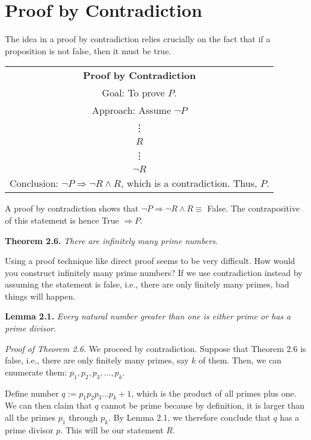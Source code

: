 \documentclass[12pt,a4paper]{article}
\begin{document}
\section*{Proof by Contradiction}
The idea in a proof by contradiction relies crucially on the fact that if a proposition is not false, then it must be true.

\begin{center}
\begin{tabular}{|c|}
\hline 
\textbf{Proof by Contradiction} \\ 
Goal: To prove $P$. \\ 
Approach: Assume $\neg P$ \\ 
\vdots \\ 
$R$ \\ 
\vdots \\ 
$\neg R$ \\ 
Conclusion: $\neg P\Rightarrow\neg R\wedge R$, which is a contradiction. Thus, $P$. \\ 
\hline 
\end{tabular} 
\end{center}

A proof by contradiction shows that $\neg P\Rightarrow\neg R\wedge R\equiv$ False. The contrapositive of this statement is hence True $\Rightarrow P$.

\newpage

\textbf{Theorem 2.6.} \textit{There are infinitely many prime numbers}.

\bigbreak

Using a proof technique like direct proof seems to be very difficult. How would you construct infinitely many prime numbers? If we use contradiction instead by assuming the statement is false, i.e., there are only finitely many primes, bad things will happen.

\bigbreak

\textbf{Lemma 2.1.} \textit{Every natural number greater than one is either prime or has a prime divisor}.

\bigbreak

\textit{Proof of Theorem 2.6.} We proceed by contradiction. Suppose that Theorem 2.6 is false, i.e., there are only finitely many primes, say $k$ of them. Then, we can enumerate them: $p_1,p_2,p_3,\dots,p_k$.

\bigbreak

Define number $q:=p_1p_2p_3\dots p_k+1$, which is the product of all primes plus one. We can then claim that $q$ cannot be prime because by definition, it is larger than all the primes $p_1$ through $p_k$. By Lemma 2.1, we therefore conclude that $q$ has a prime divisor $p$. This will be our statement $R$.
\end{document}
